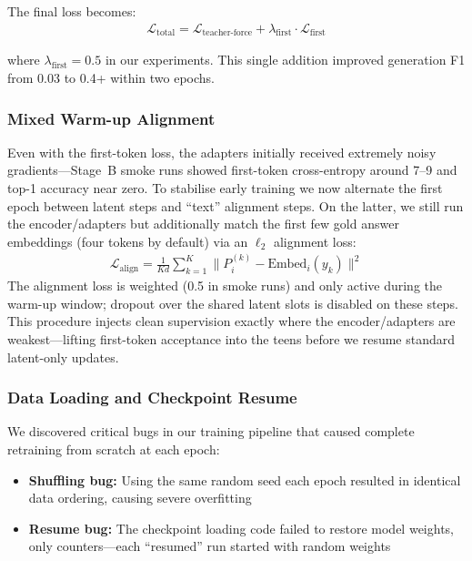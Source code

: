 \documentclass{article}
\begin{document}
The final loss becomes:
\begin{align}
\mathcal{L}_{\text{total}} = \mathcal{L}_{\text{teacher-force}} + \lambda_{\text{first}} \cdot \mathcal{L}_{\text{first}}
\end{align}

where $\lambda_{\text{first}} = 0.5$ in our experiments. This single addition improved generation F1 from 0.03 to 0.4+ within two epochs.

\subsubsection{Mixed Warm-up Alignment}

Even with the first-token loss, the adapters initially received extremely noisy gradients—Stage~B smoke runs showed first-token cross-entropy around 7--9 and top-1 accuracy near zero. To stabilise early training we now alternate the first epoch between latent steps and ``text'' alignment steps. On the latter, we still run the encoder/adapters but additionally match the first few gold answer embeddings (four tokens by default) via an $\ell_2$ alignment loss:
\begin{align}
\mathcal{L}_{\text{align}} = \frac{1}{K d} \sum_{k=1}^{K} \lVert P_i^{(k)} - \text{Embed}_i(y_k) \rVert^2
\end{align}
The alignment loss is weighted (0.5 in smoke runs) and only active during the warm-up window; dropout over the shared latent slots is disabled on these steps. This procedure injects clean supervision exactly where the encoder/adapters are weakest—lifting first-token acceptance into the teens before we resume standard latent-only updates.

\subsubsection{Data Loading and Checkpoint Resume}

We discovered critical bugs in our training pipeline that caused complete retraining from scratch at each epoch:
\begin{itemize}
\item \textbf{Shuffling bug:} Using the same random seed each epoch resulted in identical data ordering, causing severe overfitting
\item \textbf{Resume bug:} The checkpoint loading code failed to restore model weights, only counters—each ``resumed'' run started with random weights
\end{itemize}
\end{document}
